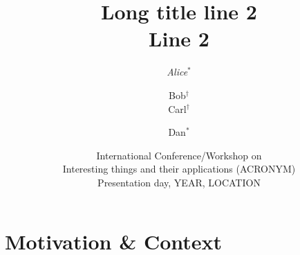 \documentclass[presentation]{beamer}\mode<presentation>{\usetheme{blackAMSBolognaFC}}
\title[Short Title]{
    Long title line 2
    \\
    Line 2
}
\author[Alice et al.]{
	\emph{Alice}$^{*}$ %
	\and 
	Bob$^{\dagger}$
	\\
	Carl$^{\dagger}$
	\and
	Dan$^{*}$
}
\institute[UniBo, Uni*]{
    $^{*}$Dipartimento di Informatica -- Scienza e Ingegneria (DISI)
    \\
    \textsc{Alma Mater Studiorum} -- Università di Bologna
    \\
    \texttt{
        \{\emph{alice}, bob\}@unibo.it %
    }
    \vspace{.3cm}
    \\
    $^{\dagger}$University of Whatever
    \\
    \texttt{\{carl, dan\}@whatever.org}
}
\date[ACRONYM, YEAR]{
	International Conference/Workshop on
	\\
	Interesting things and their applications (ACRONYM)
	\\
	Presentation day, YEAR, LOCATION
}
\begin{document}

\frame{\titlepage}

\section{Motivation \& Context}
\end{document}
